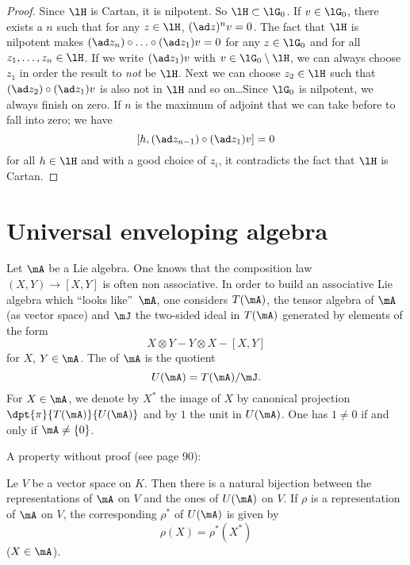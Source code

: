 \begin{proof}
Since $\lH$ is Cartan, it is nilpotent. So $\lH\subset\lG_0$. If $v\in\lG_0$, there exists a $n$ such that for any $z\in\lH$, $(\ad z)^nv=0$. The fact that $\lH$ is nilpotent makes $(\ad z_n)\circ\ldots\circ(\ad z_1)v=0$ for any $z\in\lG_0$ and for all $z_1,\ldots,z_n\in\lH$. If we write $(\ad z_1)v$ with $v\in\lG_0\setminus\lH$, we can always choose $z_1$ in order the result to \emph{not} be $\lH$. Next we can choose $z_2\in\lH$ such that $(\ad z_2)\circ(\ad z_1)v$ is also not in $\lH$ and so on\ldots Since $\lG_0$ is nilpotent, we always finish on zero. If $n$ is the maximum of adjoint that we can take before to fall into zero; we have
\[
[h, (\ad z_{n-1})\circ(\ad z_1)v ]=0
\]
for all $h\in\lH$ and with a good choice of $z_i$, it contradicts the fact that $\lH$ is Cartan.
\end{proof}

\section{Universal enveloping algebra}  \label{subsec:env_alg}

Let $\mA$ be a Lie algebra. One knows that the composition law $(X,Y)\to[X,Y]$ is often non associative. In order to build an associative Lie algebra which ``looks like''\ $\mA$, one considers $T(\mA)$, the tensor algebra of $\mA$ (as vector space) and $\mJ$ the two-sided ideal in $T(\mA)$ generated by elements of the form 
\[
   X\otimes Y-Y\otimes X -[X,Y]
\]
for $X$, $Y\in\mA$. The  of $\mA$ is the quotient  
\begin{equation}
     U(\mA)=T(\mA)/\mJ.
\end{equation}
For $X\in\mA$, we denote by $X^*$ the image of $X$ by canonical projection $\dpt{\pi}{T(\mA)}{U(\mA)}$ and by $1$ the unit in $U(\mA)$. One has $1\neq 0$ if and only if $\mA\neq\{0\}$.

A property without proof (see \cite{Helgason} page 90):

\begin{proposition}
Le $V$ be a vector space on $K$. Then there is a natural bijection between the representations of $\mA$ on $V$ and the ones of $U(\mA)$ on $V$. If $\rho$ is a representation of $\mA$ on $V$, the corresponding $\rho^*$ of $U(\mA)$ is given by
\[
   \rho(X)=\rho^*(X^*)
\]
($X\in\mA$).
\end{proposition}

